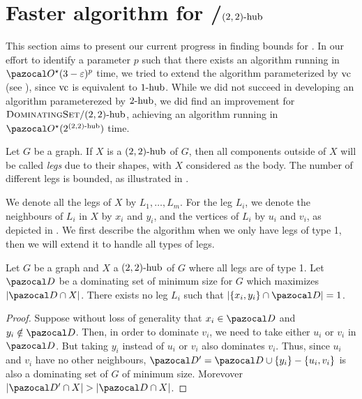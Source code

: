 \section{Faster algorithm for /$\sdhub[2,2]$}
\label{section:domset-22hub}

This section aims to present our current progress in finding bounds for . In our effort to identify a parameter $p$ such that there exists an algorithm running in $\O^\star(3 - \varepsilon)^p$ time, we tried to extend the algorithm parameterized by $\vc$ (see ), since $\vc$ is equivalent to $\shub[1]$. While we did not succeed in developing an algorithm parameterezed by $\shub[2]$, we did find an improvement for $\prob{DominatingSet}/\sdhub[2,2]$, achieving an algorithm running in $\O^\star(2^{\sdhub[2,2]})$ time.

\medskip

Let $G$ be a graph. If $X$ is a $\sdhub[2,2]$ of $G$, then all components outside of $X$ will be called \textit{legs} due to their shapes, with $X$ considered as the body. The number of different legs is bounded, as illustrated in .



We denote all the legs of $X$ by $L_1, \dots, L_m$. For the leg $L_i$, we denote the neighbours of $L_i$ in $X$ by $x_i$ and $y_i$, and the vertices of $L_i$ by $u_i$ and $v_i$, as depicted in . We first describe the algorithm when we only have legs of type 1, then we will extend it to handle all types of legs.

\begin{lemma}
    \label{lemma:legs}
    Let $G$ be a graph and $X$ a $\sdhub[2,2]$ of $G$ where all legs are of type 1. Let $\D$ be a dominating set of minimum size for $G$ which maximizes $|\D \cap X|$. There exists no leg $L_i$ such that $|\{x_i, y_i\} \cap \D| = 1$.
\end{lemma}

\begin{proof}
    Suppose without loss of generality that $x_i \in \D$ and $y_i \notin \D$. Then, in order to dominate $v_i$, we need to take either $u_i$ or $v_i$ in $\D$. But taking $y_i$ instead of $u_i$ or $v_i$ also dominates $v_i$. Thus, since $u_i$ and $v_i$ have no other neighbours, $\D' = \D \cup \{y_i\} - \{u_i, v_i\}$ is also a dominating set of $G$ of minimum size. Morevover $|\D' \cap X| > |\D \cap X|$.
\end{proof}

